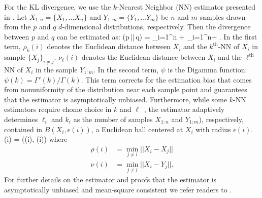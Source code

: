For the KL divergence, we use the $k$-Nearest Neighbor (NN) estimator presented in
\cite{wang2009}. Let $X_{1:n} = \{ X_1, ... X_n \}$ and $Y_{1:m} = \{ Y_1, ... Y_m \}$
be $n$ and $m$ samples drawn from the $p$ and $q$ $d$-dimensional distributions, respectively. 
Then the divergence between $p$ and $q$ can be estimated as: 
\beq \label{eq:div_est}
 \approx {}(p\,||\,q) = 
\sum\limits_{i=1}^n  +
 \sum\limits_{i=1}^n + \log
{}. 
\eeq
In the first term, $\rho_k(i)$ denotes the Euclidean distance between $X_i$ and 
the $k^\mathrm{th}$-NN of $X_i$ in sample $\{X_j\}_{i\neq j}$. $\nu_\ell(i)$
denotes the Euclidean distance between $X_i$ and the $\ell^\mathrm{th}$ NN of
$X_i$ in the sample $Y_{1:m}$. In the second term, $\psi$ is the Digamma function: 
$\psi(k) = \Gamma'(k)/\Gamma(k)$.
This term corrects for the estimation bias that comes from nonuniformity of 
the distribution near each sample point and guarantees that the estimator is
asymptotically unbiased. Furthermore, while some $k$-NN estimators require 
chome choice in $k$ and $\ell$~\citep[\emph{e.g.}][]{poczos2012}, the 
\cite{wang2009} estimator adaptively determines $\ell_i$ and $k_i$ as the number 
of samples $X_{1:n}$ and $Y_{1:m}$), respectively, contained in $B(X_i, \epsilon(i))$, 
a Euclidean ball centered at $X_i$ with radius $\epsilon(i)$. 
\beq
\epsilon(i) = \max(\rho(i), \nu(i)) 
\eeq
where 
\begin{align}
    \rho(i) &= \min_{j \neq i} || X_i - X_j|| \\
    \nu(i) &= \min_{j \neq i} || X_i - Y_j||.
\end{align}
For further details on the estimator and proofs that the estimator is
asymptotically unbiased and mean-square consistent we refer readers to
\cite{wang2009}.
